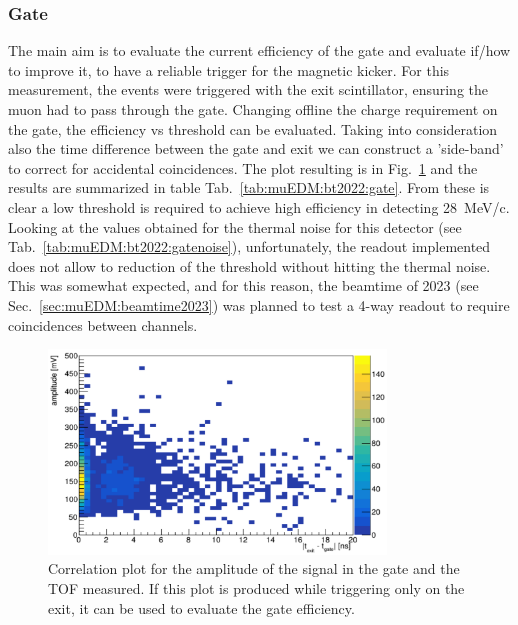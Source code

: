 \begin{refsection}
        \subsubsection{Gate}
            The main aim is to evaluate the current efficiency of the gate and evaluate if/how to improve it, to have a reliable trigger for the magnetic kicker.
            For this measurement, the events were triggered with the exit scintillator, ensuring the muon had to pass through the gate.
            Changing offline the charge requirement on the gate, the efficiency vs threshold can be evaluated.
            Taking into consideration also the time difference between the gate and exit we can construct a 'side-band' to correct for accidental coincidences.
            The plot resulting is in Fig.~\ref{fig:muEDM:bt20212gate} and the results are summarized in table Tab.~\ref{tab:muEDM:bt2022:gate}.
            From these is clear a low threshold is required to achieve high efficiency in detecting \SI{28}{MeV/c}.
            Looking at the values obtained for the thermal noise for this detector (see Tab.~\ref{tab:muEDM:bt2022:gatenoise}), unfortunately, the readout implemented does not allow to reduction of the threshold without hitting the thermal noise.
            This was somewhat expected, and for this reason, the beamtime of 2023 (see Sec.~\ref{sec:muEDM:beamtime2023}) was planned to test a 4-way readout to require coincidences between channels.\\

            \begin{figure}
                \centering
                \includegraphics[width = 0.8\textwidth]{Figures/muEDM_Nov2022/gate_eff-time.png}
                \caption[muEDM:2022 gate efficiency]{Correlation plot for the amplitude of the signal in the gate and the TOF measured. If this plot is produced while triggering only on the exit, it can be used to evaluate the gate efficiency.}
                \label{fig:muEDM:bt20212gate}
            \end{figure}
            

\end{refsection}
